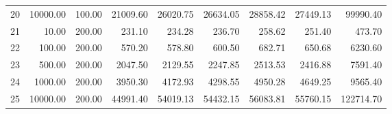 \begin{table}[ht]
\begin{tabular}{rrrrrrrrr}
  20 & 10000.00 & 100.00 & 21009.60 & 26020.75 & 26634.05 & 28858.42 & 27449.13 & 99990.40 \\ 
  21 & 10.00 & 200.00 & 231.10 & 234.28 & 236.70 & 258.62 & 251.40 & 473.70 \\ 
  22 & 100.00 & 200.00 & 570.20 & 578.80 & 600.50 & 682.71 & 650.68 & 6230.60 \\ 
  23 & 500.00 & 200.00 & 2047.50 & 2129.55 & 2247.85 & 2513.53 & 2416.88 & 7591.40 \\ 
  24 & 1000.00 & 200.00 & 3950.30 & 4172.93 & 4298.55 & 4950.28 & 4649.25 & 9565.40 \\ 
  25 & 10000.00 & 200.00 & 44991.40 & 54019.13 & 54432.15 & 56083.81 & 55760.15 & 122714.70 \\ 
   \hline
\end{tabular}
\end{table}
